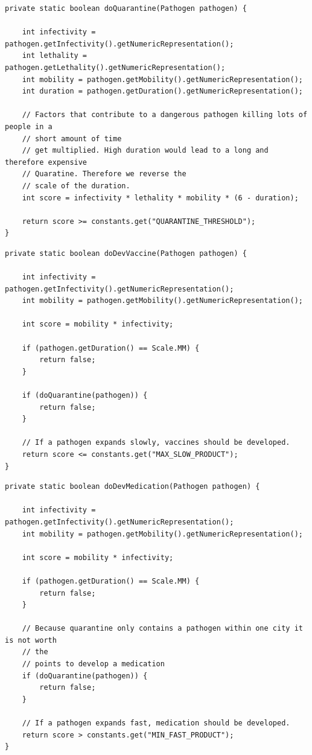 \documentclass{article}
\begin{document}
\begin{lstlisting}[title=Methode zum Entscheiden ob Pathogen unter Quarantäne gesetzt werden soll]
private static boolean doQuarantine(Pathogen pathogen) {

	int infectivity = pathogen.getInfectivity().getNumericRepresentation();
	int lethality = pathogen.getLethality().getNumericRepresentation();
	int mobility = pathogen.getMobility().getNumericRepresentation();
	int duration = pathogen.getDuration().getNumericRepresentation();

	// Factors that contribute to a dangerous pathogen killing lots of people in a
	// short amount of time
	// get multiplied. High duration would lead to a long and therefore expensive
	// Quaratine. Therefore we reverse the
	// scale of the duration.
	int score = infectivity * lethality * mobility * (6 - duration);

	return score >= constants.get("QUARANTINE_THRESHOLD");
}
\end{lstlisting}
\label{code:DoDevVaccine}
\begin{lstlisting}[title={Methode zum Entscheiden, ob Impfstoff entwickelt werden soll}]
private static boolean doDevVaccine(Pathogen pathogen) {

	int infectivity = pathogen.getInfectivity().getNumericRepresentation();
	int mobility = pathogen.getMobility().getNumericRepresentation();

	int score = mobility * infectivity;

	if (pathogen.getDuration() == Scale.MM) {
		return false;
	}

	if (doQuarantine(pathogen)) {
		return false;
	}

	// If a pathogen expands slowly, vaccines should be developed.
	return score <= constants.get("MAX_SLOW_PRODUCT");
}
\end{lstlisting}

\label{code:DoDevMedication}
\begin{lstlisting}[title={Methode zum Entscheiden, ob Medikament entwickelt werden soll}]
private static boolean doDevMedication(Pathogen pathogen) {

	int infectivity = pathogen.getInfectivity().getNumericRepresentation();
	int mobility = pathogen.getMobility().getNumericRepresentation();

	int score = mobility * infectivity;

	if (pathogen.getDuration() == Scale.MM) {
		return false;
	}

	// Because quarantine only contains a pathogen within one city it is not worth
	// the
	// points to develop a medication
	if (doQuarantine(pathogen)) {
		return false;
	}

	// If a pathogen expands fast, medication should be developed.
	return score > constants.get("MIN_FAST_PRODUCT");
}
\end{lstlisting}
\end{document}
